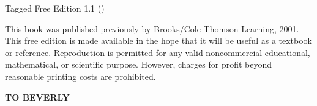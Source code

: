 \vspace*{2in}

\noindent
\medskip

\noindent
Tagged Free Edition 1.1 (\makeatletter\@date\makeatother)%

\medskip
\thispagestyle{empty}

\noindent
This book was  published previously by Brooks/Cole Thomson Learning, 2001.
This free edition is made available in the hope that it will be useful
as a textbook or reference.
 Reproduction  is
permitted
for any valid  noncommercial educational, mathematical, or scientific
purpose.
However,
charges for
profit beyond reasonable printing costs
are  prohibited.


\newpage

\noindent
\thispagestyle{empty}
\vspace*{3in}

\begin{center}\color{blue}\bfseries\Huge TO BEVERLY\end{center}

\newpage

\tableofcontents

\rmfamily

